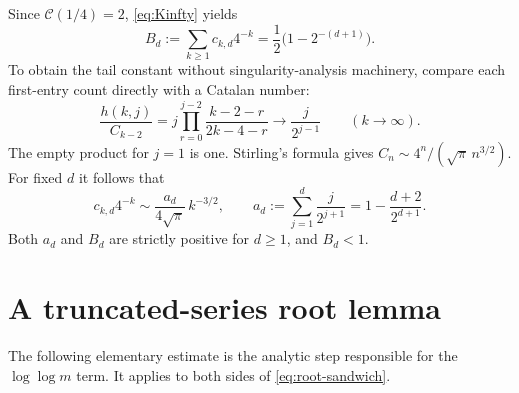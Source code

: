 \documentclass[11pt,a4paper]{article}
\theoremstyle{definition}\newaliascnt{definition}{theorem}
\theoremstyle{remark}\newaliascnt{remark}{theorem}
\newcommand{\Cat}{\mathcal C}
\begin{document}
Since $\Cat(1/4)=2$, \eqref{eq:Kinfty} yields
\begin{equation}
 B_d:=\sum_{k\ge1}c_{k,d}4^{-k}
      =\frac12\bigl(1-2^{-(d+1)}\bigr).
 \label{eq:Bd}
\end{equation}
To obtain the tail constant without singularity-analysis machinery,
compare each first-entry count directly with a Catalan number:
\begin{equation}
 \frac{h(k,j)}{C_{k-2}}
 =j\prod_{r=0}^{j-2}\frac{k-2-r}{2k-4-r}
 \longrightarrow \frac{j}{2^{j-1}}
 \qquad(k\to\infty).
 \label{eq:h-ratio}
\end{equation}
The empty product for $j=1$ is one. Stirling's formula gives
$C_n\sim4^n/(\sqrt\pi\,n^{3/2})$. For fixed $d$ it follows that
\begin{equation}
 c_{k,d}4^{-k}\sim\frac{a_d}{4\sqrt\pi}\,k^{-3/2},
 \qquad
 a_d:=\sum_{j=1}^d\frac{j}{2^{j+1}}
     =1-\frac{d+2}{2^{d+1}}.
 \label{eq:cd-tail}
\end{equation}
Both $a_d$ and $B_d$ are strictly positive for $d\ge1$, and $B_d<1$.

\section{A truncated-series root lemma}
\label{sec:root-lemma}
The following elementary estimate is the analytic step responsible for
the $\log\log m$ term. It applies to both sides of
\eqref{eq:root-sandwich}.
\end{document}
